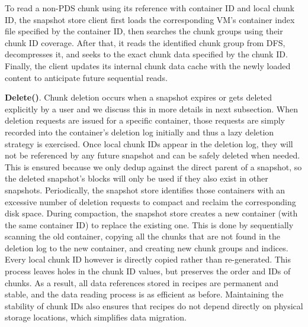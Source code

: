 To read a non-PDS chunk using its reference with container ID and local chunk ID,  the snapshot store client first loads the
corresponding VM's container index file specified by the container ID, then searches the chunk
groups  using their  chunk ID coverage.
After that, it reads the identified chunk group from DFS, decompresses it, and seeks to the exact chunk data 
specified by the chunk ID. 
Finally, the client updates its internal chunk data cache with the newly loaded content to 
anticipate future sequential reads.

\noindent\textbf{Delete()}.
Chunk deletion occurs when a snapshot expires or gets deleted explicitly by a user and we discuss this in more details in next
subsection.
When deletion requests are issued for a specific container,
those requests are simply recorded into the  container's deletion log initially and thus  a lazy
deletion strategy is exercised.
Once local chunk IDs appear in
the deletion log, they will not be referenced by any future snapshot and can be safely deleted when needed. 
This is ensured because we only dedup against the direct parent of a snapshot, so the deleted snapshot's blocks
will only be used if they also exist in other snapshots.
Periodically, the snapshot  store identifies those containers with an excessive
number of deletion requests to  compact and  reclaim the corresponding disk space. 
During compaction, the snapshot store creates a new container (with the same container ID) to replace the 
existing one. This is done by sequentially scanning the old container, copying all the chunks that are not 
found in the deletion log to the new container, and creating new chunk groups and indices. 
Every local chunk ID however is directly copied rather than re-generated. This
process leaves holes in the chunk ID values, but preserves the order and IDs of chunks.
As a result, all data references stored 
in recipes are permanent and stable, and the data reading process
is as efficient as before. Maintaining the stability of chunk IDs also ensures that recipes do not
depend directly on physical storage locations, which simplifies data migration.


